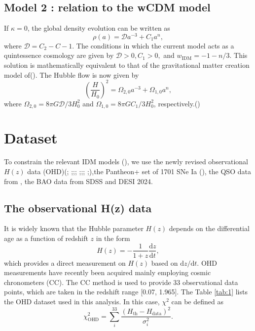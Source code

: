 \documentclass[twocolumn]{aastex631}
\begin{document}
\subsection{Model 2 : relation to the wCDM model}

   If $\kappa=0$, the global density evolution can be written as
   \begin{equation}
      \rho(a)=\mathcal{D}a^{-3}+C_1a^{n},
   \end{equation}
   where $\mathcal{D}=C_2-C-1$. The conditions in which the current 
   model acts as a quintessence cosmology are given by $\mathcal{D}>0,
   C_1>0,$ and $w_{\text{IDM}}=-1-n/3$. This solution is mathematically
   equivalent to that of the gravitational matter creation model of().
   The Hubble flow is now given by
   \begin{equation}
      \left(\frac{H}{H_0}\right)^2=\Omega_{2,0}a^{-3}+\Omega_{1,0}a^{n},
   \end{equation}
   where $\Omega_{2,0}=8\pi G\mathcal{D}/3H_0^2$ and 
   $\Omega_{1,0}=8\pi GC_1/3H_0^2$, respectively.(\cite{refId0})
   
\section{Dataset}

   To constrain the relevant IDM models (\cite{refId0}), we use the newly revised
   observational $H(z)$ data (OHD)(\cite{PhysRevD.71.123001};
   \cite{Daniel.Stern_2010};\cite{M.Moresco_2012};\cite{Zhang_2014};
   \cite{Moresco_2016};\cite{10.1093/mnras/stx301};\cite{10.1093/mnrasl/slv037};
   \cite{Borghi_2022};\cite{Jiao_2023}),the Pantheon+ set of 1701 SNe Ia 
   (\cite{Scolnic_2022}), the QSO data from \cite{Lusso_2020}, 
   the BAO data from SDSS and DESI 2024.

\subsection{The observational H(z) data}

   It is widely known that the Hubble parameter $H(z)$ depends on
   the differential age as a function of redshift $z$ in the form
   \begin{equation}
      H(z)=-\frac{1}{1+z}\frac{\mathrm{d}z}{\mathrm{d}t},\label{eq:12}
   \end{equation}
   which provides a direct measurement on $H(z)$ based on
   $\mathrm{d}z/\mathrm{d}t$.
   OHD measurements have recently been acquired mainly employing
   cosmic chronometers (CC). The CC method is used to provide 33 observational
   data points, which are taken in the redshift range [0.07, 1.965].
   The Table \ref{tab:1} lists the OHD dataset used in this analysis.
   In this case, $\chi^2$ can be defined as
   \begin{equation}
      \chi_{\text{OHD}}^2=\sum_i^{33}\frac{(H_{\text{th}}-H_{\text{data}})^2}{\sigma_i^2}.
   \end{equation}
\end{document}
